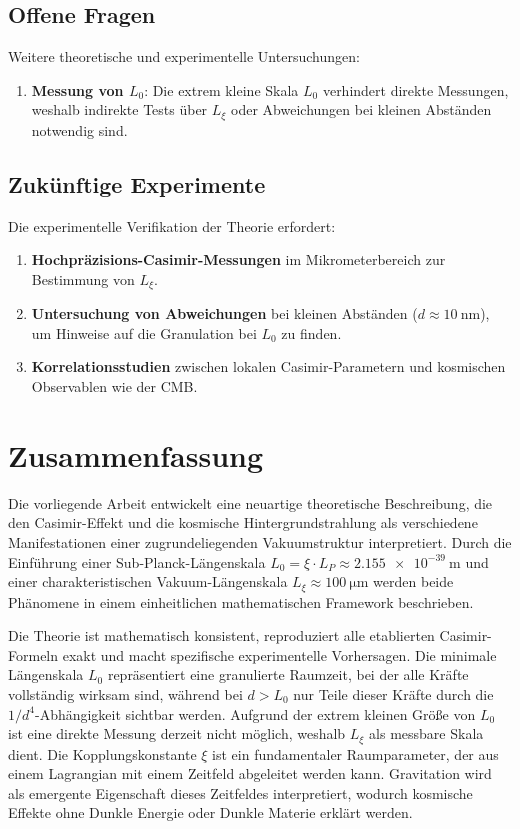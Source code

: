 \documentclass[12pt,a4paper]{article}
\begin{document}
	\subsection{Offene Fragen}
	
	Weitere theoretische und experimentelle Untersuchungen:
	
	\begin{enumerate}
		\item \textbf{Messung von \( L_0 \)}: Die extrem kleine Skala \( L_0 \) verhindert direkte Messungen, weshalb indirekte Tests über \( L_\xi \) oder Abweichungen bei kleinen Abständen notwendig sind.
	\end{enumerate}
	
	\subsection{Zukünftige Experimente}
	
	Die experimentelle Verifikation der Theorie erfordert:
	
	\begin{enumerate}
		\item \textbf{Hochpräzisions-Casimir-Messungen} im Mikrometerbereich zur Bestimmung von \( L_\xi \).
		\item \textbf{Untersuchung von Abweichungen} bei kleinen Abständen (\( d \approx \SI{10}{\nano\meter} \)), um Hinweise auf die Granulation bei \( L_0 \) zu finden.
		\item \textbf{Korrelationsstudien} zwischen lokalen Casimir-Parametern und kosmischen Observablen wie der CMB.
	\end{enumerate}
	
	\section{Zusammenfassung}
	
	Die vorliegende Arbeit entwickelt eine neuartige theoretische Beschreibung, die den Casimir-Effekt und die kosmische Hintergrundstrahlung als verschiedene Manifestationen einer zugrundeliegenden Vakuumstruktur interpretiert. Durch die Einführung einer Sub-Planck-Längenskala \( L_0 = \xi \cdot L_P \approx \SI{2.155e-39}{\meter} \) und einer charakteristischen Vakuum-Längenskala \( L_\xi \approx \SI{100}{\micro\meter} \) werden beide Phänomene in einem einheitlichen mathematischen Framework beschrieben.
	
	Die Theorie ist mathematisch konsistent, reproduziert alle etablierten Casimir-Formeln exakt und macht spezifische experimentelle Vorhersagen. Die minimale Längenskala \( L_0 \) repräsentiert eine granulierte Raumzeit, bei der alle Kräfte vollständig wirksam sind, während bei \( d > L_0 \) nur Teile dieser Kräfte durch die \( 1/d^4 \)-Abhängigkeit sichtbar werden. Aufgrund der extrem kleinen Größe von \( L_0 \) ist eine direkte Messung derzeit nicht möglich, weshalb \( L_\xi \) als messbare Skala dient. Die Kopplungskonstante \( \xi \) ist ein fundamentaler Raumparameter, der aus einem Lagrangian mit einem Zeitfeld abgeleitet werden kann. Gravitation wird als emergente Eigenschaft dieses Zeitfeldes interpretiert, wodurch kosmische Effekte ohne Dunkle Energie oder Dunkle Materie erklärt werden.
	
\end{document}
